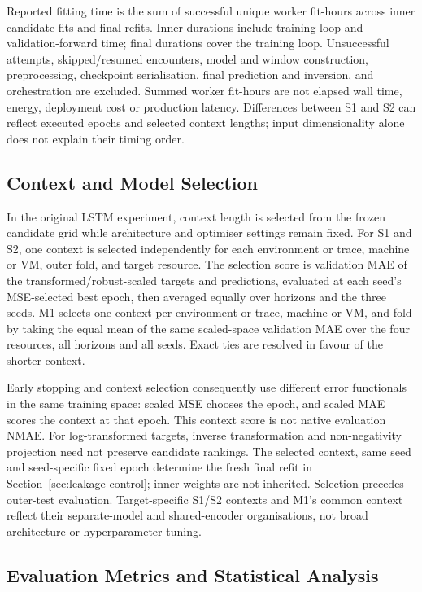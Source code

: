 \documentclass[5p,twocolumn]{elsarticle}
\begin{document}
Reported fitting time is the sum of successful unique worker fit-hours across
inner candidate fits and final refits. Inner durations include training-loop
and validation-forward time; final durations cover the training loop.
Unsuccessful attempts, skipped/resumed encounters, model and window
construction, preprocessing, checkpoint serialisation, final prediction and
inversion, and orchestration are excluded. Summed worker fit-hours are not
elapsed wall time, energy, deployment cost or production latency. Differences
between S1 and S2 can reflect executed epochs and selected context lengths;
input dimensionality alone does not explain their timing order.

\subsection{Context and Model Selection}
\label{sec:model-selection}

In the original LSTM experiment, context length is selected from the frozen
candidate grid while architecture and optimiser settings remain fixed.
For S1 and S2, one context
is selected independently for each environment or trace, machine or VM, outer
fold, and target resource. The selection score is validation MAE of the
transformed/robust-scaled targets and predictions, evaluated at each seed's
MSE-selected best epoch, then averaged equally over horizons and the three
seeds. M1 selects one context per environment or trace, machine or VM, and
fold by taking the equal mean of the same scaled-space validation MAE over
the four resources, all horizons and all seeds. Exact ties are resolved
in favour of the shorter context.

Early stopping and context selection consequently use different error
functionals in the same training space: scaled MSE chooses the epoch, and
scaled MAE scores the context at that epoch. This context score is not native
evaluation NMAE. For log-transformed targets, inverse transformation and
non-negativity projection need not preserve candidate rankings.
The selected context, same seed and seed-specific fixed epoch determine the
fresh final refit in Section~\ref{sec:leakage-control}; inner weights are not
inherited. Selection precedes outer-test evaluation. Target-specific S1/S2
contexts and M1's common context reflect their separate-model and shared-encoder
organisations, not broad architecture or hyperparameter tuning.

\subsection{Evaluation Metrics and Statistical Analysis}
\label{sec:evaluation}
\end{document}
